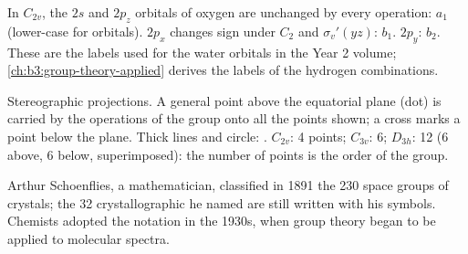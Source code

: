 \begin{example}\label{ex:b3:point-groups:water-orbitals}
In $C_{2v}$, the $2s$ and $2p_z$ orbitals of oxygen are unchanged by every
operation: $a_1$ (lower-case for orbitals). $2p_x$ changes sign under $C_2$ and
$\sigma_v'(yz)$: $b_1$. $2p_y$: $b_2$. These are the labels used for the water
orbitals in the Year 2 volume; \cref{ch:b3:group-theory-applied} derives the
labels of the hydrogen combinations.
\end{example}

\begin{omfigure}

{\small Stereographic projections. A general point above the equatorial
plane (dot) is carried by the operations of the group onto all the points
shown; a cross marks a point below the plane. Thick lines and circle:
. $C_{2v}$: 4 points; $C_{3v}$: 6; $D_{3h}$: 12 (6 above, 6
below, superimposed): the number of points is the order of the group.}
\end{omfigure}

\begin{history}
Arthur Schoenflies, a mathematician, classified in 1891 the 230 space
groups of crystals; the 32 crystallographic  he named are still
written with his symbols. Chemists adopted the notation in the 1930s,
when group theory began to be applied to molecular spectra.
\end{history}

